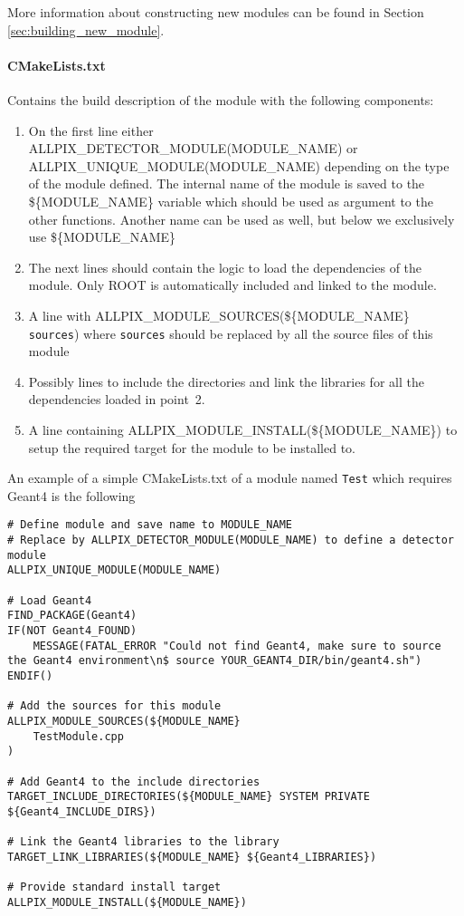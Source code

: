 More information about constructing new modules can be found in Section \ref{sec:building_new_module}.

\paragraph{CMakeLists.txt}
Contains the build description of the module with the following components:
\begin{enumerate}
\item On the first line either ALLPIX\_DETECTOR\_MODULE(MODULE\_NAME) or \\ ALLPIX\_UNIQUE\_MODULE(MODULE\_NAME) depending on the type of the module defined. The internal name of the module is saved to the \$\{MODULE\_NAME\} variable which should be used as argument to the other functions. Another name can be used as well, but below we exclusively use \$\{MODULE\_NAME\}
\item The next lines should contain the logic to load the dependencies of the module. Only ROOT is automatically included and linked to the module.
\item A line with ALLPIX\_MODULE\_SOURCES(\$\{MODULE\_NAME\} \texttt{sources}) where \texttt{sources} should be replaced by all the source files of this module
\item Possibly lines to include the directories and link the libraries for all the dependencies loaded in point~2.
\item A line containing ALLPIX\_MODULE\_INSTALL(\$\{MODULE\_NAME\}) to setup the required target for the module to be installed to.
\end{enumerate}

An example of a simple CMakeLists.txt of a module named \texttt{Test} which requires Geant4 is the following
\vspace{5pt}

\begin{verbatim}
# Define module and save name to MODULE_NAME
# Replace by ALLPIX_DETECTOR_MODULE(MODULE_NAME) to define a detector module
ALLPIX_UNIQUE_MODULE(MODULE_NAME) 

# Load Geant4
FIND_PACKAGE(Geant4)
IF(NOT Geant4_FOUND)
    MESSAGE(FATAL_ERROR "Could not find Geant4, make sure to source the Geant4 environment\n$ source YOUR_GEANT4_DIR/bin/geant4.sh")
ENDIF()

# Add the sources for this module
ALLPIX_MODULE_SOURCES(${MODULE_NAME} 
    TestModule.cpp
)

# Add Geant4 to the include directories
TARGET_INCLUDE_DIRECTORIES(${MODULE_NAME} SYSTEM PRIVATE ${Geant4_INCLUDE_DIRS})

# Link the Geant4 libraries to the library
TARGET_LINK_LIBRARIES(${MODULE_NAME} ${Geant4_LIBRARIES})

# Provide standard install target
ALLPIX_MODULE_INSTALL(${MODULE_NAME})
\end{verbatim}


